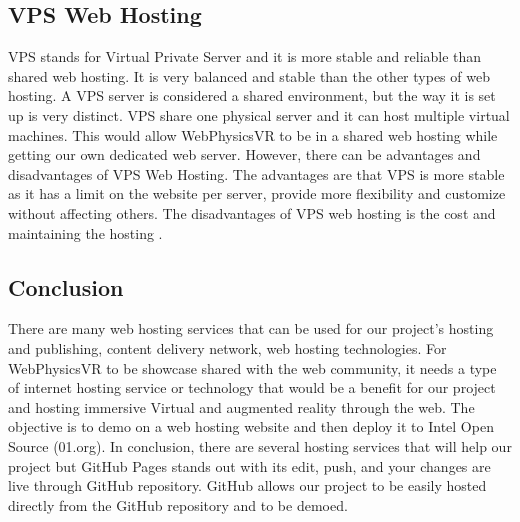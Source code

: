 \subsection{VPS Web Hosting}
VPS stands for Virtual Private Server and it is more stable and reliable than shared web hosting. It is very balanced and stable than the other types of web hosting. A VPS server is considered a shared environment, but the way it is set up is very distinct. VPS share one physical server and it can host multiple virtual machines. This would allow WebPhysicsVR to be in a shared web hosting while getting our own dedicated web server. However, there can be advantages and disadvantages of VPS Web Hosting. The advantages are that VPS is more stable as it has a limit on the website per server, provide more flexibility and customize without affecting others. The disadvantages of VPS web hosting is the cost and maintaining the hosting \cite{types_of_web_hosting}.

\subsection{Conclusion}
There are many web hosting services that can be used for our project's hosting and publishing, content delivery network, web hosting technologies. For WebPhysicsVR to be showcase shared with the web community, it needs a type of internet hosting service or technology that would be a benefit for our project and hosting immersive Virtual and augmented reality through the web. The objective is to demo on a web hosting website and then deploy it to Intel Open Source (01.org). In conclusion, there are several hosting services that will help our project but GitHub Pages stands out with its edit, push, and your changes are live through GitHub repository. GitHub allows our project to be easily hosted directly from the GitHub repository and to be demoed.  